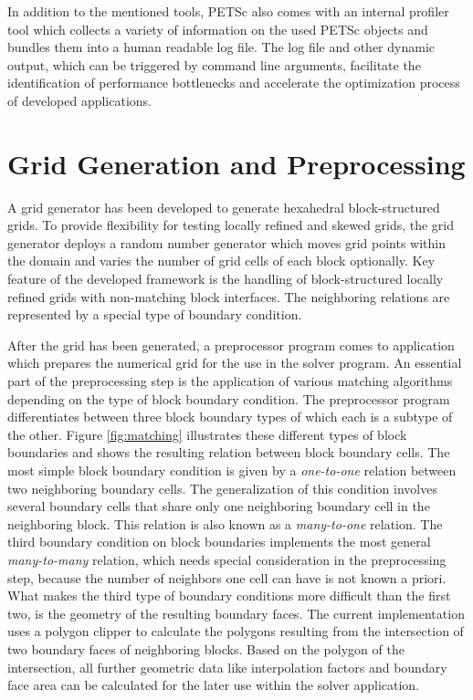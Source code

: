 In addition to the mentioned tools, PETSc also comes with an internal profiler tool which collects a variety of information on the used PETSc objects and bundles them into a human readable log file. The log file and other dynamic output, which can be triggered by command line arguments, facilitate the identification of performance bottlenecks and accelerate the optimization process of developed applications.

\section{Grid Generation and Preprocessing}
\label{sec:gridpreproc}

A grid generator has been developed to generate hexahedral block-structured grids. To provide flexibility for testing locally refined and skewed grids, the grid generator deploys a random number generator which moves grid points within the domain and varies the number of grid cells of each block optionally. Key feature of the developed framework is the handling of block-structured locally refined grids with non-matching block interfaces. The neighboring relations are represented by a special type of boundary condition.

After the grid has been generated, a preprocessor program comes to application which prepares the numerical grid for the use in the solver program. An essential part of the preprocessing step is the application of various matching algorithms depending on the type of block boundary condition. The preprocessor program differentiates between three block boundary types of which each is a subtype of the other. Figure \ref{fig:matching} illustrates these different types of block boundaries and shows the resulting relation between block boundary cells. The most simple block boundary condition is given by a \emph{one-to-one} relation between two neighboring boundary cells. The generalization of this condition involves several boundary cells that share only one neighboring boundary cell in the neighboring block. This relation is also known as a \emph{many-to-one} relation. The third boundary condition on block boundaries implements the most general \emph{many-to-many} relation, which needs special consideration in the preprocessing step, because the number of neighbors one cell can have is not known a priori. What makes the third type of boundary conditions more difficult than the first two, is the geometry of the resulting boundary faces. The current implementation uses a polygon clipper to calculate the polygons resulting from the intersection of two boundary faces of neighboring blocks. Based on the polygon of the intersection, all further geometric data like interpolation factors and boundary face area can be calculated for the later use within the solver application.

